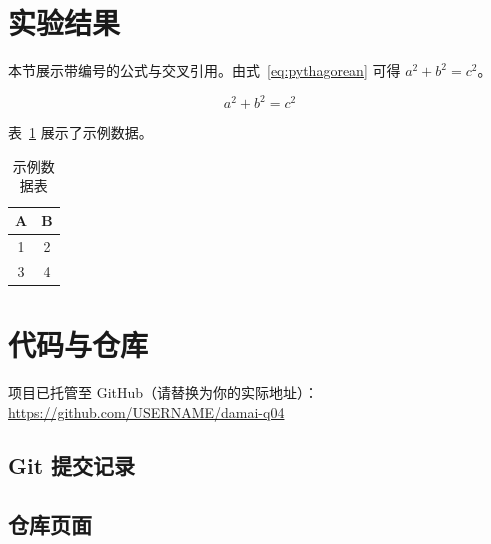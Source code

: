 \documentclass[a4paper,11pt]{ctexart}
\begin{document}
\section{实验结果}

本节展示带编号的公式与交叉引用。由式~\eqref{eq:pythagorean} 可得
$a^2 + b^2 = c^2$。

\begin{equation}
  a^2 + b^2 = c^2 \label{eq:pythagorean}
\end{equation}

表~\ref{tab:example} 展示了示例数据。

\begin{table}[htbp]
  \centering
  \caption{示例数据表}\label{tab:example}
  \begin{tabular}{cc}
    \toprule
    A & B \\
    \midrule
    1 & 2 \\
    3 & 4 \\
    \bottomrule
  \end{tabular}
\end{table}

\section{代码与仓库}

项目已托管至 GitHub（请替换为你的实际地址）：
\url{https://github.com/USERNAME/damai-q04}

\subsection{Git 提交记录}


\subsection{仓库页面}

\end{document}

